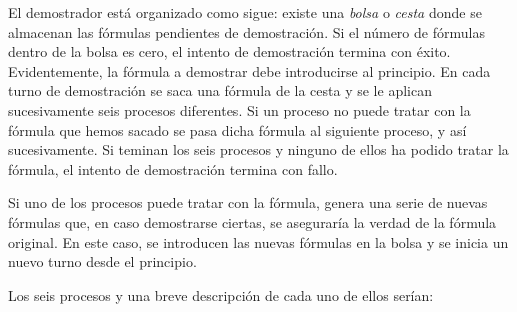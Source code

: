 \documentclass[a4paper,10pt]{article}
\begin{document}
\par\vspace{10pt}

El demostrador está organizado como sigue: existe una \emph{bolsa} o \emph{cesta} donde se almacenan las fórmulas pendientes de demostración. Si el número de fórmulas dentro de la bolsa es cero, el intento de demostración termina con éxito. Evidentemente, la fórmula a demostrar debe introducirse al principio. En cada turno de demostración se saca una fórmula de la cesta y se le aplican sucesivamente seis procesos diferentes. Si un proceso no puede tratar con la fórmula que hemos sacado se pasa dicha fórmula al siguiente proceso, y así sucesivamente. Si teminan los seis procesos y ninguno de ellos ha podido tratar la fórmula, el intento de demostración termina con fallo.

\par\vspace{10pt}

Si uno de los procesos puede tratar con la fórmula, genera una serie de nuevas fórmulas que, en caso demostrarse ciertas, se aseguraría la verdad de la fórmula original. En este caso, se introducen las nuevas fórmulas en la bolsa y se inicia un nuevo turno desde el principio.

\par\vspace{10pt}

Los seis procesos y una breve descripción de cada uno de ellos serían:

\par\vspace{10pt}
\end{document}
